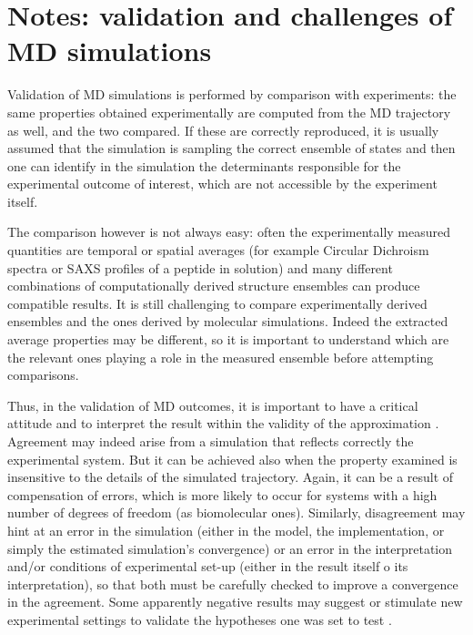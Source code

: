 \documentclass[graybox]{svmult}
\begin{document}
\section{Notes: validation and challenges of MD simulations}

Validation of MD simulations is performed by comparison with experiments: the same properties obtained experimentally are computed from the MD trajectory as well, and the two compared. If these are correctly reproduced, it is usually assumed that the simulation is sampling the correct ensemble of states and then one can identify in the simulation the determinants responsible for the experimental outcome of interest, which are not accessible by the experiment itself.

The comparison however is not always easy: often the experimentally measured quantities are temporal or spatial averages (for example Circular Dichroism spectra or SAXS profiles of a peptide in solution) and many different combinations of computationally derived structure ensembles can produce compatible results. It is still challenging to compare experimentally derived ensembles and the ones derived by molecular simulations. Indeed the extracted average properties may be different, so it is important to understand which are the relevant ones playing a role in the measured ensemble before attempting comparisons.

Thus, in the validation of MD outcomes, it is important to have a critical attitude and to interpret the result within the validity of the approximation \cite{VanGunsteren2008}.
%
Agreement may indeed arise from a simulation that reflects correctly the experimental system. But it can be achieved also when the property examined is insensitive to the details of the simulated trajectory. Again, it can be a result of compensation of errors, which is more likely to occur for systems with a high number of degrees of freedom (as biomolecular ones).
%
Similarly, disagreement may hint at an error in the simulation (either in the model, the implementation, or simply the estimated simulation's convergence) or an error in the interpretation and/or conditions of experimental set-up (either in the result itself o its interpretation), so that both must be carefully checked to improve a convergence in the agreement.
%
Some apparently negative results may suggest or stimulate new experimental settings to validate the hypotheses one was set to test \cite{Goncalves2013,Meissner2014}.
\end{document}
